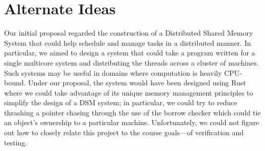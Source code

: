 \documentclass{scrartcl}
\begin{document}
\section{Alternate Ideas}
Our initial proposal regarded the construction of a Distributed Shared Memory System that could help schedule and manage tasks in a distributed manner. In particular, we aimed to design a system that could take a program written for a single multicore system and distributing the threads across a cluster of machines. Such systems may be useful in domains where computation is heavily CPU-bound. Under our proposal, the system would have been designed using Rust where we could take advantage of its unique memory management principles to simplify the design of a DSM system; in particular, we could try to reduce thrashing a pointer chasing through the use of the borrow checker which could tie an object's ownership to a particular machine. Unfortunately, we could not figure out how to closely relate this project to the course goals—of verification and testing.


\printbibliography
\end{document}
